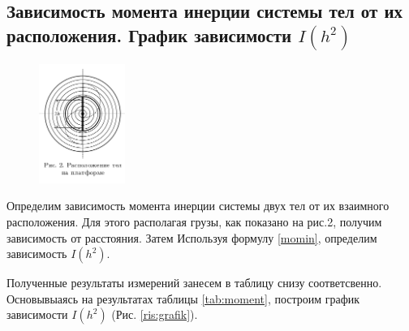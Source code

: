 \documentclass[a4paper,14pt]{extarticle}
\begin{document}
	
	\subsection{Зависимость момента инерции системы тел от их расположения. График зависимости $I(h^2)$}
	\begin{figure}
		\vspace{-3em}
		\includegraphics[width=0.25\textwidth]{rasp}
	\end{figure}

	Определим зависимость момента инерции системы двух тел от их взаимного расположения. Для этого располагая грузы, как показано на рис.2, получим зависимость от расстояния. Затем Используя формулу \ref{momin}, определим зависимость $I(h^2)$.

	Полученные результаты измерений занесем в таблицу снизу соответсвенно. Основывыаясь на результатах таблицы \eqref{tab:moment}, построим график зависимости $ I(h^{2}) $ (Рис. \ref{ris:grafik}).
	\bigskip\bigskip\bigskip\bigskip\bigskip
	
\end{document}
